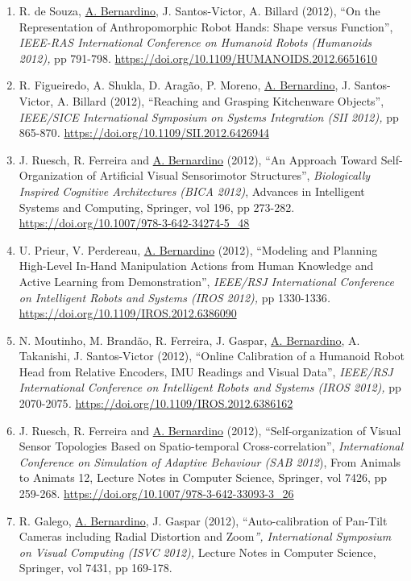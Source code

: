 \documentclass[
]{article}
\begin{document}
\begin{enumerate}
\item
  R. de Souza, \ul{A. Bernardino}, J. Santos-Victor, A. Billard (2012),
  ``On the Representation of Anthropomorphic Robot Hands: Shape versus
  Function'', \emph{IEEE-RAS International Conference on Humanoid Robots
  (Humanoids 2012),} pp 791-798.
  \url{https://doi.org/10.1109/HUMANOIDS.2012.6651610}~
\item
  R. Figueiredo, A. Shukla, D. Aragão, P. Moreno, \ul{A. Bernardino}, J.
  Santos-Victor, A. Billard (2012), ``Reaching and Grasping Kitchenware
  Objects'', \emph{IEEE/SICE International Symposium on Systems
  Integration (SII 2012),} pp 865-870\emph{.}
  \url{https://doi.org/10.1109/SII.2012.6426944}
\item
  J. Ruesch, R. Ferreira and \ul{A. Bernardino} (2012), ``An Approach
  Toward Self-Organization of Artificial Visual Sensorimotor
  Structures'', \emph{Biologically Inspired Cognitive Architectures
  (BICA 2012)}, Advances in Intelligent Systems and Computing, Springer,
  vol 196, pp 273-282.
  \url{https://doi.org/10.1007/978-3-642-34274-5_48}
\item
  U. Prieur, V. Perdereau, \ul{A. Bernardino} (2012), ``Modeling and
  Planning High-Level In-Hand Manipulation Actions from Human Knowledge
  and Active Learning from Demonstration'', \emph{IEEE/RSJ International
  Conference on Intelligent Robots and Systems (IROS 2012),} pp
  1330-1336\emph{.} \url{https://doi.org/10.1109/IROS.2012.6386090}~
\item
  N. Moutinho, M. Brandão, R. Ferreira, J. Gaspar, \ul{A. Bernardino},
  A. Takanishi, J. Santos-Victor (2012), ``Online Calibration of a
  Humanoid Robot Head from Relative Encoders, IMU Readings and Visual
  Data'', \emph{IEEE/RSJ International Conference on Intelligent Robots
  and Systems (IROS 2012),} pp 2070-2075\emph{.}
  \url{https://doi.org/10.1109/IROS.2012.6386162}~
\item
  J. Ruesch, R. Ferreira and \ul{A. Bernardino} (2012),
  ``Self-organization of Visual Sensor Topologies Based on
  Spatio-temporal Cross-correlation'', \emph{International Conference on
  Simulation of Adaptive Behaviour (SAB 2012}), From Animals to Animats
  12, Lecture Notes in Computer Science, Springer, vol 7426, pp 259-268.
  \url{https://doi.org/10.1007/978-3-642-33093-3_26}~
\item
  R. Galego, \ul{A. Bernardino}, J. Gaspar (2012), ``Auto-calibration of
  Pan-Tilt Cameras including Radial Distortion and Zoom\emph{'',
  International Symposium on Visual Computing (ISVC 2012),} Lecture
  Notes in Computer Science, Springer, vol 7431, pp 169-178.

\end{enumerate}
\end{document}
